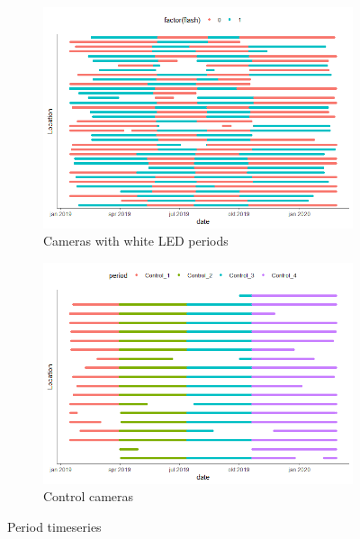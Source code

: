 \begin{figure}
	\begin{subfigure}{1\textwidth}
		\centering
		\includegraphics[scale=.8]{../R/FLM_notebook_files/figure-gfm/effort-facet-1.png}
			\caption{\label{fig:timeseries_flash} Cameras with white LED periods}	
	\end{subfigure}	
	\begin{subfigure}{1\textwidth}
		\centering
		\includegraphics[scale=.8]{../R/FLM_notebook_files/figure-gfm/effort-facet-2.png}
			\caption{\label{fig:timeseries_control} Control cameras}	
	\end{subfigure}	
\caption{\label{fig:timeseries_figure} Period timeseries}
\end{figure}



